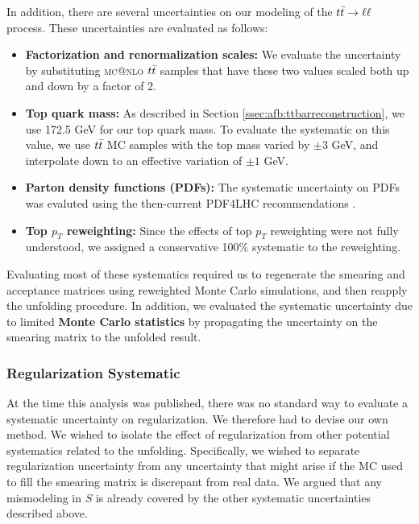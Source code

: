 In addition, there are several uncertainties on our modeling of the
$t\bar{t} \rightarrow \ell\ell$ process. These uncertainties are evaluated as follows:

\begin{itemize}
\item \textbf{Factorization and renormalization scales:} We evaluate
  the uncertainty by substituting \textsc{mc@nlo} $t\bar{t}$ samples that have
  these two values scaled both up and down by a factor of 2.
\item \textbf{Top quark mass:} As described in Section
  \ref{ssec:afb:ttbarreconstruction}, we use 172.5 GeV for our top
  quark mass. To evaluate the systematic on this value, we use
  $t\bar{t}$ MC samples with the top mass varied by $\pm 3$ GeV, and
  interpolate down to an effective variation of $\pm 1$ GeV.
\item \textbf{Parton density functions (PDFs):} The systematic
  uncertainty on PDFs was evaluted using the then-current PDF4LHC
  recommendations \cite{pdf4lhc}.
\item \textbf{Top $p_T$ reweighting:} Since the effects of top $p_T$
  reweighting were not fully understood, we assigned a conservative
  100\% systematic to the reweighting.
\end{itemize}

Evaluating most of these systematics required us to regenerate the
smearing and acceptance matrices using reweighted Monte Carlo
simulations, and then reapply the unfolding procedure. In addition, we
evaluated the systematic uncertainty due to limited \textbf{Monte
  Carlo statistics} by propagating the uncertainty on the smearing
matrix to the unfolded result.

\subsubsection{Regularization Systematic}
\label{sssec:afb:systematics:regularization}

At the time this analysis was published, there was no standard way to
evaluate a systematic uncertainty on regularization. We therefore had
to devise our own method. We wished to isolate the effect of
regularization from other potential systematics related to the
unfolding. Specifically, we wished to separate regularization
uncertainty from any uncertainty that might arise if the MC used to
fill the smearing matrix is discrepant from real data. We argued that
any mismodeling in $S$ is already covered by the other systematic
uncertainties described above.

